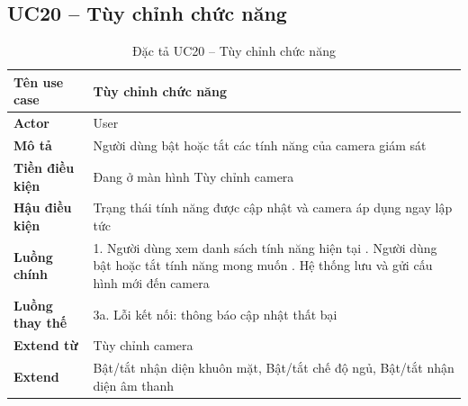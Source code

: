 \subsection*{UC20 -- Tùy chỉnh chức năng}
\begin{table}[H]
    \captionsetup{justification=raggedright, singlelinecheck=false}
    \caption{Đặc tả UC20 -- Tùy chỉnh chức năng}
\centering
\begin{tabular}{|p{3.5cm}|p{10cm}|}
\hline
\textbf{Tên use case} & Tùy chỉnh chức năng \\
\hline
\textbf{Actor} & User \\
\hline
\textbf{Mô tả} & Người dùng bật hoặc tắt các tính năng
  của camera giám sát \\
\hline
\textbf{Tiền điều kiện} & Đang ở màn hình Tùy chỉnh camera \\
\hline
\textbf{Hậu điều kiện} & Trạng thái tính năng được cập nhật
  và camera áp dụng ngay lập tức \\
\hline
\textbf{Luồng chính} &
  1. Người dùng xem danh sách tính năng hiện tại \newline
  2. Người dùng bật hoặc tắt tính năng mong muốn \newline
  3. Hệ thống lưu và gửi cấu hình mới đến camera \\
\hline
\textbf{Luồng thay thế} &
  3a. Lỗi kết nối: thông báo cập nhật thất bại \\
\hline
\textbf{Extend từ} & Tùy chỉnh camera \\
\hline
\textbf{Extend} & Bật/tắt nhận diện khuôn mặt,
  Bật/tắt chế độ ngủ,
  Bật/tắt nhận diện âm thanh \\
\hline
\end{tabular}

\end{table}

